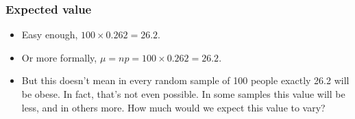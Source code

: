 \documentclass[slidestop,compress,mathserif]{beamer}
\begin{document}



\begin{frame}
\frametitle{Expected value}


\pause

\begin{itemize}

\item Easy enough, $100 \times 0.262 = 26.2$.

\pause

\item Or more formally, $\mu = np = 100 \times 0.262 = 26.2$.

\pause

\item But this doesn't mean in every random sample of 100 people exactly 26.2 will be obese. In fact, that's not even possible. In some samples this value will be less, and in others more. How much would we expect this value to vary?

\end{itemize}

\end{frame}

\end{document}
